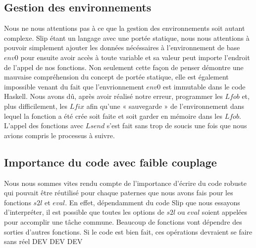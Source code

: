 \documentclass{article}
\begin{document}
	\subsection{Gestion des environnements}
	Nous ne nous attentions pas à ce que la gestion des environnements soit autant
	complexe. Slip étant un langage avec une portée statique, nous nous attentions
	à pouvoir simplement ajouter les données nécéssaires à l'environnement de base
	$env0$ pour ensuite avoir accès à toute variable et sa valeur peut importe l'endroit
	de l'appel de nos fonctions. Non seulement cette façon de penser démontre une
	mauvaise compréhension du concept de portée statique, elle est également impossible
	venant du fait que l'envrionnement $env0$ est immutable dans le code Haskell.
	Nous avons dû, après avoir réalisé notre erreur, programmer les $Lfob$ et, plus
	difficilement, les $Lfix$ afin qu'une « sauvegarde » de l'environnement dans
	lequel la fonction a été crée soit faite et soit garder en mémoire dans les
	$Lfob$. L'appel des fonctions avec $Lsend$ s'est fait sans trop de soucis une fois
	que nous avions compris le processus à suivre.

	\subsection{Importance du code avec faible couplage}
	Nous nous sommes vites rendu compte de l'importance d'écrire du code robuste qui
	pouvait être réutilisé pour chaque paternes que nous avons fais pour les fonctions
	$s2l$ et $eval$. En effet, dépendamment du code Slip que nous essayons d'interpréter,
	il est possible que toutes les options de $s2l$ ou $eval$ soient appelées pour
	accomplir une tâche commune. Beaucoup de fonctions vont dépendre des sorties d'autres
	fonctions. Si le code est bien fait, ces opérations devraient se faire sans réel DEV DEV DEV
\end{document}
